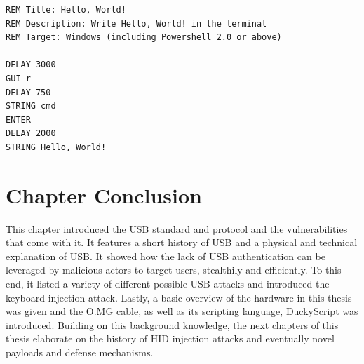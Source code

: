 \begin{lstlisting}[caption={Hello, World! in DuckyScript 1.0}, label={lst:hello_world_duckyscript}, captionpos=b]
REM Title: Hello, World!
REM Description: Write Hello, World! in the terminal
REM Target: Windows (including Powershell 2.0 or above)

DELAY 3000
GUI r
DELAY 750
STRING cmd
ENTER
DELAY 2000
STRING Hello, World!
\end{lstlisting}



\section{Chapter Conclusion}

This chapter introduced the USB standard and protocol and the vulnerabilities that come with it. It features a short history of USB and a physical and technical explanation of USB. It showed how the lack of USB authentication can be leveraged by malicious actors to target users, stealthily and efficiently. To this end, it listed a variety of different possible USB attacks and introduced the keyboard injection attack.
Lastly, a basic overview of the hardware in this thesis was given and the O.MG cable, as well as its scripting language, DuckyScript was introduced. 
Building on this background knowledge, the next chapters of this thesis elaborate on the history of HID injection attacks and eventually novel payloads and defense mechanisms. 